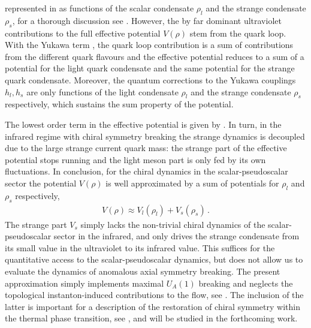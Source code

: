 \documentclass[aps,twocolumn,prd,superscriptaddress]{revtex4-2}
\begin{document}
represented in  as functions of the scalar condensate $\rho_l$ and the strange condensate $\rho_s$, for a thorough discussion see \cite{Jungnickel:1996aa}. However, the by far dominant ultraviolet contributions to the full effective potential $V(\rho)$ stem from the quark loop. With the Yukawa term , the quark loop contribution is a sum of contributions from the different quark flavours and the effective potential reduces to a sum of a potential for the light quark condensate and the same potential for the strange quark condensate. Moreover, the quantum corrections to the Yukawa couplings $h_l,h_s$ are only functions of the light condensate $\rho_l$ and the strange condensate $\rho_s$ respectively, which sustains the sum property of the potential. 

The lowest order term in the effective potential is given by . In turn, in the infrared regime with chiral symmetry breaking the strange dynamics is decoupled due to the large strange current quark mass: the strange part of the effective potential stops running and the light meson part is only fed by its own fluctuations. In conclusion, for the chiral dynamics in the scalar-pseudoscalar sector the potential $V( \rho)$ is well approximated by a sum of potentials for $\rho_l$ and $\rho_s$ respectively, 
%
\begin{align} 
	V(\rho) \approx  V_l( \rho_l) + V_s( \rho_s)\,. 
	\label{eq:Vs-V-UV}
\end{align}
%
The strange part $V_s$ simply lacks the non-trivial chiral dynamics of the scalar-pseudoscalar sector in the infrared, and only drives the strange condensate from its small value in the ultraviolet to its infrared value. This suffices for the quantitative access to the scalar-pseudoscalar dynamics, but does not allow us to evaluate the dynamics of anomalous axial symmetry breaking. The present approximation simply implements maximal $U_A(1)$ breaking and neglects the topological instanton-induced contributions to the flow, see \cite{Pawlowski:1996ch}. The inclusion of the latter is important for a description of the restoration of chiral symmetry within the thermal phase transition, see \cite{Braun:2020mhk}, and will be studied in the forthcoming work. 
\end{document}
